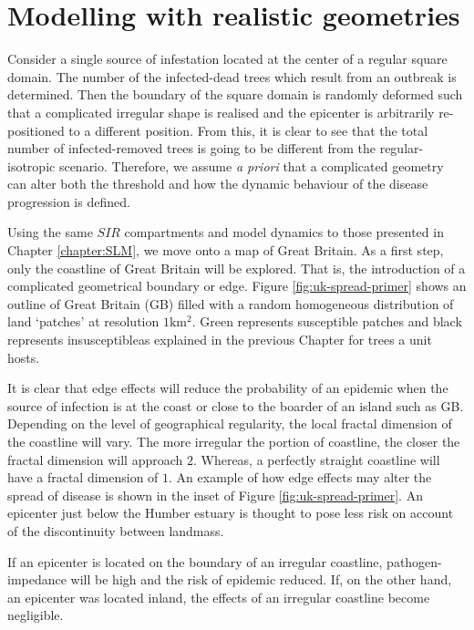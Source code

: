 \section{Modelling with realistic geometries}


Consider a single source of infestation located at the center of a regular square domain. %
The number of the infected-dead trees which result from an outbreak is determined. %
Then the boundary of the square domain is randomly deformed such that a complicated irregular %
shape is realised and  the epicenter is arbitrarily re-positioned  to a different position. %
From this, it is clear to see that the total number of infected-removed trees is going to be different from the regular-isotropic scenario. %
Therefore, we assume \textit{a priori} that a complicated geometry can alter both the threshold and how the dynamic behaviour of the disease progression is defined. %

Using the same $SIR$ compartments and model dynamics to those presented in Chapter \ref{chapter:SLM}, %
we move onto a map of Great Britain. As a first step, only the coastline of Great Britain will be explored. %
That is, the introduction of a complicated geometrical boundary or edge. %
Figure \ref{fig:uk-spread-primer} shows an outline of Great Britain (GB) filled with a random homogeneous distribution of land `patches' at resolution $1\mathrm{km^2}$. %
Green represents susceptible patches and black represents insusceptible\textemdash as explained in the previous Chapter for trees a unit hosts. %

It is clear that edge effects will reduce the probability of an epidemic when the source %
of infection is at the coast or close to the boarder of an island such as GB. %
Depending on the level of geographical %
regularity, the local fractal dimension of the coastline will vary. %
The more irregular the portion of coastline, the closer the fractal dimension will approach $2$. %
Whereas, a perfectly straight coastline will have a fractal dimension of $1$. An example of %
how edge effects may alter the spread of disease is shown in the inset of Figure \ref{fig:uk-spread-primer}. %
An epicenter just below the Humber estuary is thought to pose less risk on account of the discontinuity between landmass. %

If an epicenter is located on the boundary of an irregular coastline, pathogen-impedance %
will be high and the risk of epidemic reduced. If, on the other hand, an epicenter was located inland, %
the effects of an irregular coastline become negligible. %

